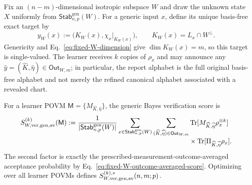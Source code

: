 \documentclass[11pt]{article}
\newcommand{\Tr}{\operatorname{Tr}}
\newcommand{\1}{\mathbf 1}
\theoremstyle{plain}
\theoremstyle{definition}
\theoremstyle{remark}
\begin{document}
Fix an $(n-m)$-dimensional isotropic subspace $W$ and draw the unknown state
$X$ uniformly from $\mathsf{Stab}_{n,p}^{\mathrm{gen}}(W)$.  For a generic
input $x$, define its unique basis-free exact target by
\begin{equation}
 y_W(x):=\bigl(K_W(x),\chi_x|_{K_W(x)}\bigr),
 \qquad K_W(x)=L_x\cap W^\perp.
 \label{eq:section4-generic-original-exact-target}
\end{equation}
Genericity and Eq.~\eqref{eq:fixed-W-dimension} give
$\dim K_W(x)=m$, so this target is single-valued.  The learner receives
$k$ copies of $\rho_x$ and may announce any
$\widehat y=(\widehat K,\widehat\eta)\in\mathsf{Out}_{W,m}$; in particular,
the report alphabet is the full original basis-free alphabet and not merely
the refined canonical alphabet associated with a revealed chart.

For a learner POVM
$\mathsf M=\{M_{\widehat K,\widehat\eta}\}$, the generic Bayes verification
score is
\begin{align}
 S_{W,\rm ver,gen,av}^{(k)}(\mathsf M)
 :=\frac1{|\mathsf{Stab}_{n,p}^{\mathrm{gen}}(W)|}
 \sum_{x\in\mathsf{Stab}_{n,p}^{\mathrm{gen}}(W)}
 \sum_{(\widehat K,\widehat\eta)\in\mathsf{Out}_{W,m}}
 &\Tr[M_{\widehat K,\widehat\eta}\rho_x^{\otimes k}]\notag\\[-1mm]
 &\times\Tr[\Pi_{\widehat K,\widehat\eta}\rho_x].
 \label{eq:section4-generic-original-Bayes-score}
\end{align}
The second factor is exactly the prescribed-measurement-outcome-averaged
acceptance probability by Eq.~\eqref{eq:fixed-W-outcome-averaged-score}.
Optimizing over all learner POVMs defines
$S_{W,\rm ver,gen,av}^{(k),*}(n,m;p)$.
\end{document}
